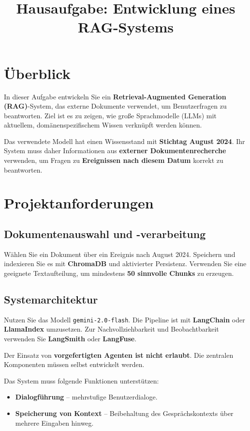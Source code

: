 \documentclass[12pt]{article}
\title{\textbf{Hausaufgabe: Entwicklung eines RAG-Systems}}
\author{}
\date{}
\begin{document}
\maketitle

\section*{Überblick}

In dieser Aufgabe entwickeln Sie ein \textbf{Retrieval-Augmented Generation (RAG)}-System, das externe Dokumente verwendet, um Benutzerfragen zu beantworten. Ziel ist es zu zeigen, wie große Sprachmodelle (LLMs) mit aktuellem, domänenspezifischem Wissen verknüpft werden können.

Das verwendete Modell hat einen Wissensstand mit \textbf{Stichtag August 2024}. Ihr System muss daher Informationen aus \textbf{externer Dokumentenrecherche} verwenden, um Fragen zu \textbf{Ereignissen nach diesem Datum} korrekt zu beantworten.

\section*{Projektanforderungen}

\subsection*{Dokumentenauswahl und -verarbeitung}
Wählen Sie ein Dokument über ein Ereignis nach August 2024. Speichern und indexieren Sie es mit \textbf{ChromaDB} und aktivierter Persistenz. Verwenden Sie eine geeignete Textaufteilung, um mindestens \textbf{50 sinnvolle Chunks} zu erzeugen.

\subsection*{Systemarchitektur}
Nutzen Sie das Modell \texttt{gemini-2.0-flash}. Die Pipeline ist mit \textbf{LangChain} oder \textbf{LlamaIndex} umzusetzen. Zur Nachvollziehbarkeit und Beobachtbarkeit verwenden Sie \textbf{LangSmith} oder \textbf{LangFuse}.

Der Einsatz von \textbf{vorgefertigten Agenten ist nicht erlaubt}. Die zentralen Komponenten müssen selbst entwickelt werden.

Das System muss folgende Funktionen unterstützen:
\begin{itemize}[noitemsep]
  \item \textbf{Dialogführung} – mehrstufige Benutzerdialoge.
  \item \textbf{Speicherung von Kontext} – Beibehaltung des Gesprächskontexts über mehrere Eingaben hinweg.
\end{itemize}
\end{document}
